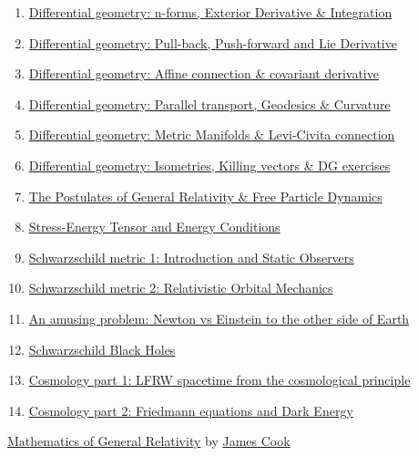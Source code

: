 \documentclass[11pt]{article}
\begin{document}
\begin{enumerate}
	\item \href{https://mp.weixin.qq.com/s/FBRWhUipgZewFcfzVrcimg}{Differential geometry: n-forms, Exterior Derivative \& Integration}	%
	\item \href{https://mp.weixin.qq.com/s/wkqcdXbThvyn-x4mAk7aMA}{Differential geometry: Pull-back, Push-forward and Lie Derivative}	%
	\item \href{https://mp.weixin.qq.com/s/pHGe01ThKrqTA6ju6sI_uA}{Differential geometry: Affine connection \& covariant derivative}	%
	\item \href{https://mp.weixin.qq.com/s/JTrxgI5wrqTes5qQCXdB0w}{Differential geometry: Parallel transport, Geodesics \& Curvature}	%
	\item \href{https://mp.weixin.qq.com/s/NfE7OtWC7wIgPdOyaJQPtQ}{Differential geometry: Metric Manifolds \& Levi-Civita connection}	%
	\item \href{https://mp.weixin.qq.com/s/JaHCPykBUondp9OjHrqmBg}{Differential geometry: Isometries, Killing vectors \& DG exercises}	%
	\item \href{https://mp.weixin.qq.com/s/ic5FrWxGx2YU_Pd3tIOGVg}{The Postulates of General Relativity \& Free Particle Dynamics}	%
	\item \href{https://mp.weixin.qq.com/s/8Qe1KfS9HW8pClRgkVE3kg}{Stress-Energy Tensor and Energy Conditions}	%
	\item \href{https://mp.weixin.qq.com/s/h6I2Zvjyiy-i3WbMFPKgTA}{Schwarzschild metric 1: Introduction and Static Observers}	%
	\item \href{https://mp.weixin.qq.com/s/A4E0upPZ6bVDz7JZ1ciSYg}{Schwarzschild metric 2: Relativistic Orbital Mechanics}	%
	\item \href{https://mp.weixin.qq.com/s/gbpcHrbTtXKx4cBzgL1SgQ}{An amusing problem: Newton vs Einstein to the other side of Earth}	%
	\item \href{https://mp.weixin.qq.com/s/yV4MUwI-cSHLnixl4m6hHg}{Schwarzschild Black Holes}	%
	\item \href{https://mp.weixin.qq.com/s/O7iPcuFHIJRUci5RzUexrw}{Cosmology part 1: LFRW spacetime from the cosmological principle}	%
	\item \href{https://mp.weixin.qq.com/s/rsMwoztXRz_RiK23YNA5jA}{Cosmology part 2: Friedmann equations and Dark Energy}	%
\end{enumerate}

\begin{center}
	{\large  \href{https://www.youtube.com/playlist?list=PLBY4G2o7DhF3L9RzG0NuUnRlm8eqEUkhe}{Mathematics of General Relativity} by {\large \href{http://www.supermath.info/}{James Cook}}}
\end{center}
\end{document}

